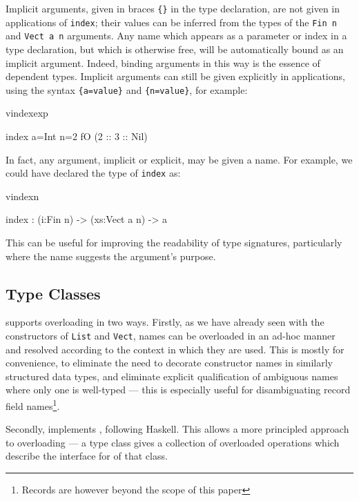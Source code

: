 \noindent
Implicit arguments, given in braces \texttt{\{\}} in the type declaration, are not given in
applications of \texttt{index}; their values can be inferred from the types of
the \texttt{Fin n} and \texttt{Vect a n} arguments. Any name which appears as a parameter
or index in a type declaration, but which is otherwise free, will be automatically
bound as an implicit argument. Indeed, binding arguments in this way is the essence
of dependent types.
Implicit arguments can still be given explicitly in applications, using the syntax
\texttt{\{a=value\}} and \texttt{\{n=value\}}, for example:

\begin{SaveVerbatim}{vindexexp}

index {a=Int} {n=2} fO (2 :: 3 :: Nil)

\end{SaveVerbatim}

\noindent
In fact, any argument, implicit or explicit, may be given a name. For example,
we could have declared the type of \texttt{index} as:

\begin{SaveVerbatim}{vindexn}

index : (i:Fin n) -> (xs:Vect a n) -> a

\end{SaveVerbatim}

\noindent
This can be useful for improving the readability of type signatures, particularly
where the name suggests the argument's purpose.

\subsection{Type Classes}

\Idris{} supports overloading in two ways. Firstly, as we have already seen with
the constructors of \texttt{List} and \texttt{Vect}, names
can be overloaded in an ad-hoc manner and resolved according to the context in which
they are used. This is mostly for convenience, to eliminate the need to decorate
constructor names in similarly structured data types, and eliminate explicit qualification
of ambiguous names where only one is well-typed --- this is especially useful
for disambiguating record field names\footnote{Records are however beyond the scope
of this paper}.

Secondly, \Idris{} implements , following Haskell.  This
allows a more principled approach to overloading --- a type class gives a
collection of overloaded operations which describe the interface for
 of that class.

